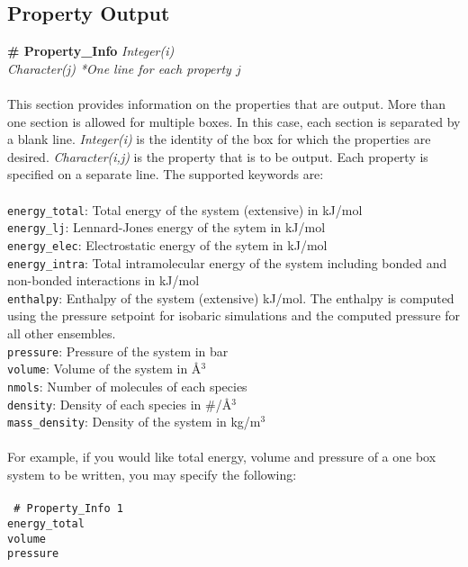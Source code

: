 \subsection{Property Output}\label{sec:Property_Info}
{\bf \# Property\_Info} {\it Integer(i)} \\
{\it Character(j) *One line for each property $j$} \\ \\
%
This section provides information on the properties that are output. 
More than one section is allowed for multiple boxes. 
In this case, each section is separated by a blank line. 
{\it Integer(i)} is the identity of the box for which the properties are desired. 
{\it Character(i,j)} is the property that is to be output. 
Each property is specified on a separate line. 
The supported keywords are: \\ \\
%
\texttt{energy\_total}: Total energy of the system (extensive) in kJ/mol \\
\texttt{energy\_lj}: Lennard-Jones energy of the sytem in kJ/mol \\
\texttt{energy\_elec}: Electrostatic energy of the sytem in kJ/mol \\
\texttt{energy\_intra}: Total intramolecular energy of the system including bonded and non-bonded 
interactions in kJ/mol \\
\texttt{enthalpy}: Enthalpy of the system (extensive) kJ/mol. 
The enthalpy is computed using the pressure setpoint for isobaric simulations and 
the computed pressure for all other ensembles. \\
\texttt{pressure}: Pressure of the system in bar \\
\texttt{volume}: Volume of the system in \AA$^3$ \\
\texttt{nmols}: Number of molecules of each species \\
\texttt{density}: Density of each species in \#/\AA$^3$ \\
\texttt{mass\_density}: Density of the system in kg/m$^3$ \\ \\
%
For example, if you would like total energy, volume and pressure of a one box system to be written, you may 
specify the following: \\ \\
%
\texttt{
\# Property\_Info 1 \\
energy\_total \\ 
volume \\ 
pressure \\ \\}
